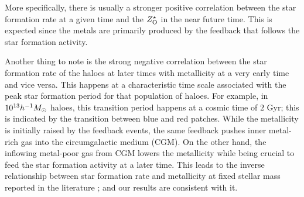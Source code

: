 More specifically, there is usually a stronger positive correlation between the star formation rate at a given time and the $Z^{\star}_{\rm{O}}$ in the near future time. This is expected since the metals are primarily produced by the feedback that follows the star formation activity. 

Another thing to note is the strong negative correlation between the star formation rate of the haloes at later times with metallicity at a very early time and vice versa. 
This happens at a characteristic time scale associated with the peak star formation period for that population of haloes. 
For example, in $10^{13} h^{-1}M_{\odot}$ haloes, this transition period happens at a cosmic time of $2$ Gyr; this is indicated by the transition between blue and red patches. 
% 
While the metallicity is initially raised by the feedback events, the same feedback pushes inner metal-rich gas into the circumgalactic medium (CGM). On the other hand, the inflowing metal-poor gas from CGM lowers the metallicity while being crucial to feed the star formation activity at a later time. 
This leads to the inverse relationship between star formation rate and metallicity at fixed stellar mass reported in the literature \citep[][]{2011DaveFinlatorOppenheimer,2018TorreyVogelsberger_etal_SFRZ}; and our results are consistent with it.

